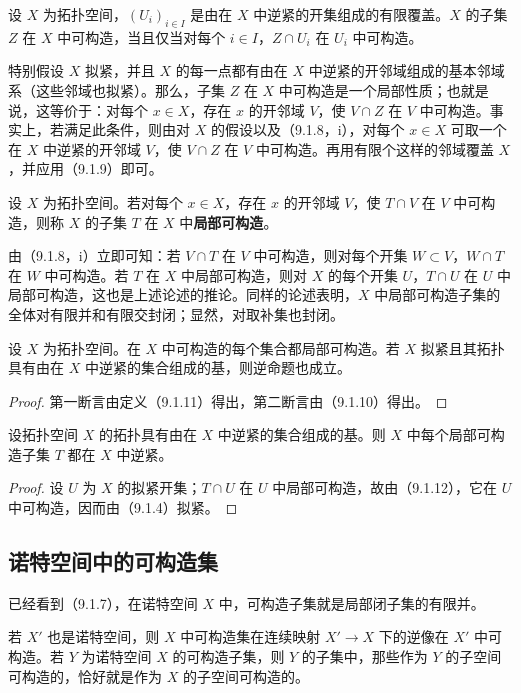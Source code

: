 设 $X$ 为拓扑空间，$(U_i)_{i\in I}$ 是由在 $X$ 中逆紧的开集组成的有限覆盖。$X$ 的子集 $Z$ 在 $X$ 中可构造，当且仅当对每个 $i\in I$，$Z\cap U_i$ 在 $U_i$ 中可构造。

特别假设 $X$ 拟紧，并且 $X$ 的每一点都有由在 $X$ 中逆紧的开邻域组成的基本邻域系（这些邻域也拟紧）。那么，子集 $Z$ 在 $X$ 中可构造是一个局部性质；也就是说，这等价于：对每个 $x\in X$，存在 $x$ 的开邻域 $V$，使 $V\cap Z$ 在 $V$ 中可构造。事实上，若满足此条件，则由对 $X$ 的假设以及（9.1.8，i），对每个 $x\in X$ 可取一个在 $X$ 中逆紧的开邻域 $V$，使 $V\cap Z$ 在 $V$ 中可构造。再用有限个这样的邻域覆盖 $X$，并应用（9.1.9）即可。

设 $X$ 为拓扑空间。若对每个 $x\in X$，存在 $x$ 的开邻域 $V$，使 $T\cap V$ 在 $V$ 中可构造，则称 $X$ 的子集 $T$ 在 $X$ 中\textbf{局部可构造}。

由（9.1.8，i）立即可知：若 $V\cap T$ 在 $V$ 中可构造，则对每个开集 $W\subset V$，$W\cap T$ 在 $W$ 中可构造。若 $T$ 在 $X$ 中局部可构造，则对 $X$ 的每个开集 $U$，$T\cap U$ 在 $U$ 中局部可构造，这也是上述论述的推论。同样的论述表明，$X$ 中局部可构造子集的全体对有限并和有限交封闭；显然，对取补集也封闭。

设 $X$ 为拓扑空间。在 $X$ 中可构造的每个集合都局部可构造。若 $X$ 拟紧且其拓扑具有由在 $X$ 中逆紧的集合组成的基，则逆命题也成立。
\begin{proof}
第一断言由定义（9.1.11）得出，第二断言由（9.1.10）得出。
\end{proof}

设拓扑空间 $X$ 的拓扑具有由在 $X$ 中逆紧的集合组成的基。则 $X$ 中每个局部可构造子集 $T$ 都在 $X$ 中逆紧。
\begin{proof}
设 $U$ 为 $X$ 的拟紧开集；$T\cap U$ 在 $U$ 中局部可构造，故由（9.1.12），它在 $U$ 中可构造，因而由（9.1.4）拟紧。
\end{proof}

\subsection{诺特空间中的可构造集}
已经看到（9.1.7），在诺特空间 $X$ 中，可构造子集就是局部闭子集的有限并。

若 $X'$ 也是诺特空间，则 $X$ 中可构造集在连续映射 $X'\to X$ 下的逆像在 $X'$ 中可构造。若 $Y$ 为诺特空间 $X$ 的可构造子集，则 $Y$ 的子集中，那些作为 $Y$ 的子空间可构造的，恰好就是作为 $X$ 的子空间可构造的。

